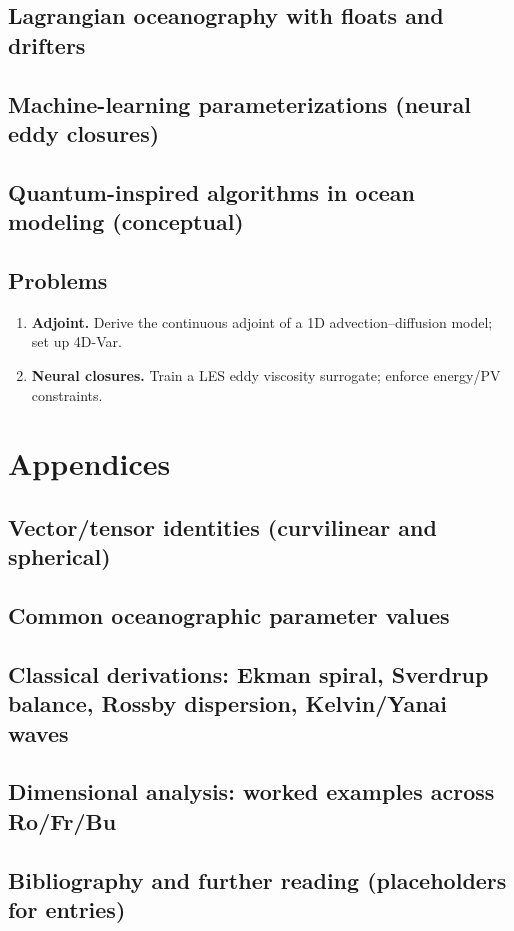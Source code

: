 \documentclass[12pt]{book}
\begin{document}
\section{Lagrangian oceanography with floats and drifters}
\section{Machine-learning parameterizations (neural eddy closures)}
\section{Quantum-inspired algorithms in ocean modeling (conceptual)}
\section*{Problems}
\begin{enumerate}
  \item \textbf{Adjoint.} Derive the continuous adjoint of a 1D advection--diffusion model; set up 4D-Var.
  \item \textbf{Neural closures.} Train a LES eddy viscosity surrogate; enforce energy/PV constraints.
\end{enumerate}

\appendix
\chapter{Appendices}
\section{Vector/tensor identities (curvilinear and spherical)}
\section{Common oceanographic parameter values}
\section{Classical derivations: Ekman spiral, Sverdrup balance, Rossby dispersion, Kelvin/Yanai waves}
\section{Dimensional analysis: worked examples across Ro/Fr/Bu}
\section{Bibliography and further reading (placeholders for entries)}
\end{document}
